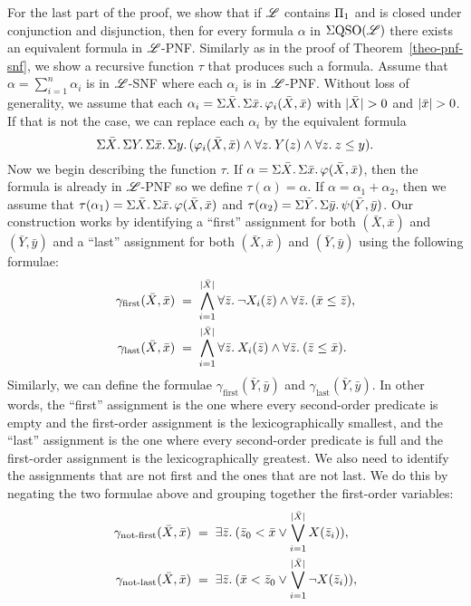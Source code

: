 For the last part of the proof, we show that if $\mathscr{L}$ contains $\Pi_{1}$ and is closed under conjunction and disjunction, then for every formula $\alpha$ in $\Sigma{\rm QSO}(\mathscr{L})$ there exists an equivalent formula in $\mathscr{L}$-PNF. 
Similarly as in the proof of Theorem~\ref{theo-pnf-snf}, we show a recursive function $\tau$ that produces such a formula. 
Assume that $\alpha = \sum_{i = 1}^n \alpha_i$ is in $\mathscr{L}$-SNF where each $\alpha_i$ is in $\mathscr{L}$-PNF. 
Without loss of generality, we assume that each $\alpha_i = \Sigma{\bar{X}}.\,\Sigma{\bar{x}}.\,\varphi_i(\bar{X},\bar{x})$ with $\vert \bar{X} \vert > 0$ and $\vert \bar{x} \vert > 0$. 
If that is not the case, we can replace each $\alpha_i$ by the equivalent formula
$$
\Sigma{\bar{X}}.\, \Sigma{Y}.\,\Sigma{\bar{x}}.\,\Sigma{y}.\,(\varphi_i(\bar{X},\bar{x})\wedge \forall{z}.\: Y(z) \wedge \forall{z}.\: z \leq y).
$$
Now we begin describing the function $\tau$. 
If $\alpha = \Sigma{\bar{X}}.\,\Sigma{\bar{x}}.\,\varphi(\bar{X},\bar{x})$, then the formula is already in $\mathscr{L}$-PNF so we define $\tau(\alpha) = \alpha$. 
If $\alpha = \alpha_1 + \alpha_2$, then we assume that $\tau(\alpha_1) = \Sigma{\bar{X}}.\,\Sigma{\bar{x}}.\,\varphi(\bar{X},\bar{x})$ and $\tau(\alpha_2) = \Sigma{\bar{Y}}.\,\Sigma{\bar{y}}.\,\psi(\bar{Y},\bar{y})$. 
Our construction works by identifying a ``first'' assignment for both $(\bar{X},\bar{x})$ and $(\bar{Y},\bar{y})$ and a ``last'' assignment for both $(\bar{X},\bar{x})$ and $(\bar{Y},\bar{y})$ using the following formulae:
\begin{align*}
\gamma_{\text{first}}(\bar{X},\bar{x}) & \; = \;  \bigwedge_{i = 1}^{\vert \bar{X} \vert} \forall{\bar{z}}.\:\neg X_i(\bar{z}) \wedge \forall{\bar{z}}.\:(\bar{x}\leq\bar{z}), \\
\gamma_{\text{last}}(\bar{X},\bar{x}) & \; = \;  \bigwedge_{i = 1}^{\vert \bar{X} \vert} \forall{\bar{z}}.\: X_i(\bar{z}) \wedge \forall{\bar{z}}.\:(\bar{z}\leq\bar{x}).
\end{align*}
Similarly, we can define the formulae $\gamma_{\text{first}}(\bar{Y},\bar{y})$ and $\gamma_{\text{last}}(\bar{Y},\bar{y})$.
In other words, the ``first'' assignment is the one where every second-order predicate is empty and the first-order assignment is the lexicographically smallest, and the ``last'' assignment is the one where every second-order predicate is full and the first-order assignment is the lexicographically greatest. 
We also need to identify the assignments that are not first and the ones that are not last. 
We do this by negating the two formulae above and grouping together the first-order variables:
\begin{align*}
\gamma_{\text{not-first}}(\bar{X},\bar{x}) & \; = \; \exists{\bar{z}}.\:(\bar{z}_0 < \bar{x} \vee \bigvee_{i = 1}^{\vert \bar{X} \vert}X(\bar{z}_i)), \\
\gamma_{\text{not-last}}(\bar{X},\bar{x}) & \; = \; \exists{\bar{z}}.\:(\bar{x} < \bar{z}_0 \vee \bigvee_{i = 1}^{\vert \bar{X} \vert}\neg X(\bar{z}_i)),
\end{align*}
